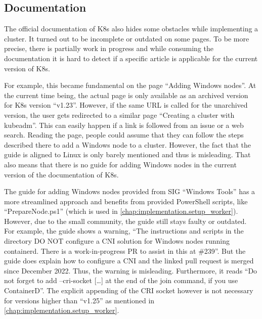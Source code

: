 \subsection{Documentation}
The official documentation of \ac{K8s} also hides some obstacles while implementing a cluster. It turned out to be incomplete or outdated on some pages.
To be more precise, there is partially work in progress and while consuming the documentation it is hard to detect if a specific article is applicable for the current version of \ac{K8s}.

For example, this became fundamental on the page \enquote{Adding Windows nodes}\cite{Kubernetes.20220419}. At the current time being, the actual page is only available as an archived version for \ac{K8s} version \enquote{v1.23}. However, if the same \ac{URL} is called for the unarchived version, the user gets redirected to a similar page \enquote{Creating a cluster with kubeadm}\cite{Kubernetes.20221107}. This can easily happen if a link is followed from an issue or a web search. Reading the page, people could assume that they can follow the steps described there to add a \ac{Windows} node to a cluster. However, the fact that the guide is aligned to Linux is only barely mentioned and thus is misleading.
That also means that there is no guide for adding \ac{Windows} nodes in the current version of the documentation of \ac{K8s}.

The guide for adding \ac{Windows} nodes provided from \ac{SIG} \enquote{Windows Tools}\cite{GitHubKubernetesSIGWindowsTools.20230213} has a more streamlined approach and benefits from provided PowerShell scripts, like \enquote{PrepareNode.ps1} (which is used in \autoref{chap:implementation.setup_worker}). However, due to the small community, the guide still stays faulty or outdated. For example, the guide shows a warning, \enquote{The instructions and scripts in the directory DO NOT configure a CNI solution for Windows nodes running containerd. There is a work-in-progress PR to assist in this at \#239}\cite{GitHubKubernetesSIGWindowsTools.20230213}. But the guide does explain how to configure a \ac{CNI} and the linked pull request is merged since December 2022. Thus, the warning is misleading.
Furthermore, it reads \enquote{Do not forget to add --cri-socket [\dots] at the end of the join command, if you use ContainerD}\cite{GitHubKubernetesSIGWindowsTools.20230213}. The explicit appending of the \ac{CRI} socket however is not necessary for versions higher than \enquote{v1.25} as mentioned in \autoref{chap:implementation.setup_worker}.

